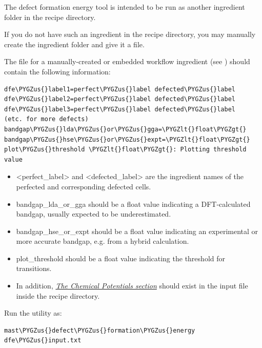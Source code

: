 \documentclass[letterpaper,10pt,english]{sphinxmanual}
\def\PYGZus{\char`\_}
\def\PYGZlt{\char`\<}
\def\PYGZgt{\char`\>}
\begin{document}
The defect formation energy tool is intended to be run as another ingredient folder in the recipe directory.

If you do not have such an ingredient in the recipe directory, you may manually create the ingredient folder and give it a  file.

The  file for a manually-created or embedded workflow ingredient (see ) should contain the following information:

\begin{Verbatim}[commandchars=\\\{\}]
dfe\PYGZus{}label1=perfect\PYGZus{}label defected\PYGZus{}label
dfe\PYGZus{}label2=perfect\PYGZus{}label defected\PYGZus{}label
dfe\PYGZus{}label3=perfect\PYGZus{}label defected\PYGZus{}label
(etc. for more defects)
bandgap\PYGZus{}lda\PYGZus{}or\PYGZus{}gga=\PYGZlt{}float\PYGZgt{}
bandgap\PYGZus{}hse\PYGZus{}or\PYGZus{}expt=\PYGZlt{}float\PYGZgt{}
plot\PYGZus{}threshold \PYGZlt{}float\PYGZgt{}: Plotting threshold value
\end{Verbatim}
\begin{itemize}
\item {} 
\textless{}perfect\_label\textgreater{} and \textless{}defected\_label\textgreater{} are the ingredient names of the perfected and corresponding defected cells.

\item {} 
bandgap\_lda\_or\_gga should be a float value indicating a DFT-calculated bandgap, usually expected to be underestimated.

\item {} 
bandgap\_hse\_or\_expt should be a float value indicating an experimental or more accurate bandgap, e.g. from a hybrid calculation.

\item {} 
plot\_threshold should be a float value indicating the threshold for transitions.

\item {} 
In addition, {\hyperref[3_1_7_chemicalpotentials::doc]{\emph{The Chemical Potentials section}}} should exist in the  input file inside the recipe directory.

\end{itemize}

Run the utility as:

\begin{Verbatim}[commandchars=\\\{\}]
mast\PYGZus{}defect\PYGZus{}formation\PYGZus{}energy dfe\PYGZus{}input.txt
\end{Verbatim}
\end{document}
